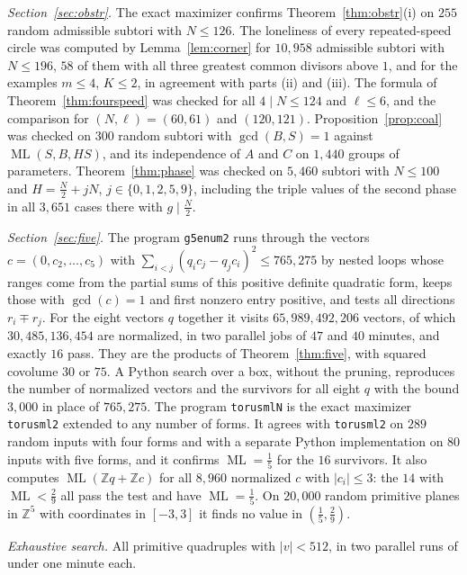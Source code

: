 \documentclass[12pt]{amsart}
\theoremstyle{definition}\newtheorem{definition}[theorem]{Definition}
\theoremstyle{remark}\newtheorem{remark}[theorem]{Remark}
\newcommand{\Z}{\mathbb Z}\newcommand{\R}{\mathbb R}\newcommand{\T}{\mathbb T}
\newcommand{\ML}{\operatorname{ML}}
\newcommand{\eucl}[1]{\lvert #1\rvert}
\begin{document}
\emph{Section~\ref{sec:obstr}.} The exact maximizer confirms Theorem~\ref{thm:obstr}(i) on $255$ random admissible subtori with $N\le126$. The loneliness of every repeated-speed circle was computed by Lemma~\ref{lem:corner} for $10{,}958$ admissible subtori with $N\le196$, $58$ of them with all three greatest common divisors above $1$, and for the examples $m\le4$, $K\le2$, in agreement with parts (ii) and (iii). The formula of Theorem~\ref{thm:fourspeed} was checked for all $4\mid N\le124$ and $\ell\le6$, and the comparison for $(N,\ell)=(60,61)$ and $(120,121)$. Proposition~\ref{prop:coal} was checked on $300$ random subtori with $\gcd(B,S)=1$ against $\ML(S,B,HS)$, and its independence of $A$ and $C$ on $1{,}440$ groups of parameters. Theorem~\ref{thm:phase} was checked on $5{,}460$ subtori with $N\le100$ and $H=\frac N2+jN$, $j\in\{0,1,2,5,9\}$, including the triple values of the second phase in all $3{,}651$ cases there with $g\mid\frac N2$.

\emph{Section~\ref{sec:five}.} The program \texttt{g5enum2} runs through the vectors $c=(0,c_2,\dots,c_5)$ with $\sum_{i<j}(q_ic_j-q_jc_i)^2\le765{,}275$ by nested loops whose ranges come from the partial sums of this positive definite quadratic form, keeps those with $\gcd(c)=1$ and first nonzero entry positive, and tests all directions $r_i\mp r_j$. For the eight vectors $q$ together it visits $65{,}989{,}492{,}206$ vectors, of which $30{,}485{,}136{,}454$ are normalized, in two parallel jobs of $47$ and $40$ minutes, and exactly $16$ pass. They are the products of Theorem~\ref{thm:five}, with squared covolume $30$ or $75$. A Python search over a box, without the pruning, reproduces the number of normalized vectors and the survivors for all eight $q$ with the bound $3{,}000$ in place of $765{,}275$. The program \texttt{torusmlN} is the exact maximizer \texttt{torusml2} extended to any number of forms. It agrees with \texttt{torusml2} on $289$ random inputs with four forms and with a separate Python implementation on $80$ inputs with five forms, and it confirms $\ML=\frac15$ for the $16$ survivors. It also computes $\ML(\Z q+\Z c)$ for all $8{,}960$ normalized $c$ with $|c_i|\le3$: the $14$ with $\ML<\frac29$ all pass the test and have $\ML=\frac15$. On $20{,}000$ random primitive planes in $\Z^5$ with coordinates in $[-3,3]$ it finds no value in $(\frac15,\frac29)$.

\emph{Exhaustive search.} All primitive quadruples with $\eucl v<512$, in two parallel runs of under one minute each.
\end{document}
